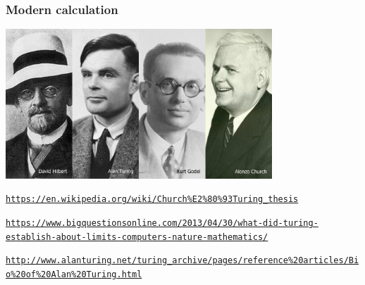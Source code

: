 \documentclass[11pt]{beamer}
\begin{document}
\begin{frame}[fragile]
  \frametitle{Modern calculation}
 \centering
  \includegraphics[width=0.75\textwidth]{./img/turing-et-al.jpg}
  
   \begin{itemize} 
   	\myitem \textcolor{\CSBase}{\tiny \texttt{\url{https://en.wikipedia.org/wiki/Church\%E2\%80\%93Turing_thesis}}}
   	
   \myitem \textcolor{\CSBase}{\tiny \texttt{\url{https://www.bigquestionsonline.com/2013/04/30/what-did-turing-establish-about-limits-computers-nature-mathematics/}}}
   
    \myitem \textcolor{\CSBase}{\tiny \texttt{\url{http://www.alanturing.net/turing_archive/pages/reference\%20articles/Bio\%20of\%20Alan\%20Turing.html}}}
   
   \end{itemize}
\end{frame}
\end{document}

